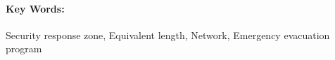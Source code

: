 \maketitle  
\thispagestyle{empty}   
\setcounter{page}{-100} 
\paragraph{Key Words:}
Security response zone, Equivalent length, Network, Emergency evacuation program


\newpage
\tableofcontents
\thispagestyle{empty}   
\newpage


\setcounter{page}{1}   
\pagestyle{fancy}
